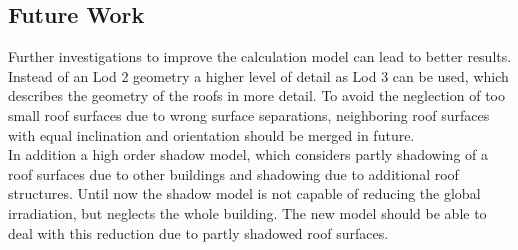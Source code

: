 \subsection{Future Work}

Further investigations to improve the calculation model can lead to better results. Instead of an Lod 2 geometry a higher level of detail as Lod 3 can be used, which describes the geometry of the roofs in more detail. To avoid the neglection of too small roof surfaces due to wrong surface separations, neighboring roof surfaces with equal inclination and orientation should be merged in future.\\
In addition a high order shadow model, which considers partly shadowing of a roof surfaces due to other buildings and shadowing due to additional roof structures. Until now the shadow model is not capable of reducing the global irradiation, but neglects the whole building. The new model should be able to deal with this reduction due to partly shadowed roof surfaces.